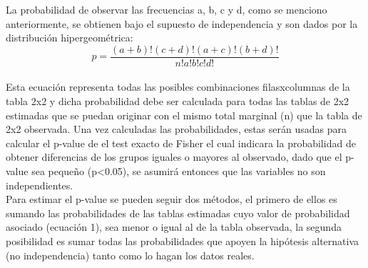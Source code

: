 \documentclass[12pt]{article}
\begin{document}
La probabilidad de observar las frecuencias a, b, c y d, como se menciono anteriormente, se obtienen bajo el supuesto de independencia y son dados por la distribución hipergeométrica:\\

\begin{equation}
p=\frac{(a+b)!(c+d)!(a+c)!(b+d)!}{n!a!b!c!d!}
\end{equation}
\\
Esta ecuación representa todas las posibles combinaciones filasxcolumnas de la tabla 2x2 y dicha probabilidad debe ser calculada para todas las tablas de 2x2 estimadas que se puedan originar con el mismo total marginal (n) que la tabla de 2x2 observada. Una vez calculadas las probabilidades, estas serán usadas para calcular el p-value de el test exacto de Fisher el cual indicara la probabilidad de obtener diferencias de los grupos iguales o mayores al observado, dado que el p-value sea pequeño (p<0.05), se asumirá entonces que las variables no son independientes.\\

Para estimar el p-value se pueden seguir dos métodos, el primero de ellos es sumando las probabilidades de las tablas estimadas cuyo valor de probabilidad asociado (ecuación 1), sea menor o igual al de la tabla observada, la segunda posibilidad es sumar todas las probabilidades que apoyen la hipótesis alternativa (no independencia) tanto como lo hagan los datos reales.
\end{document}
